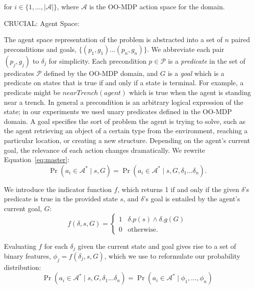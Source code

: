\documentclass[11pt]{article}
\begin{document}
\noindent for $i \in \{1, \ldots, |\mathcal{A}|\}$, where
$\mathcal{A}$ is the OO-MDP action space for the domain.

CRUCIAL: Agent Space:

The agent space representation of the problem is abstracted
into a set of $n$ paired preconditions and goals, $\{
(p_1, g_1) \ldots (p_{n}, g_{n}) \}$. We abbreviate each pair $(p_j,
g_j)$ to $\delta_j$ for simplicity. Each precondition $p \in
\mathcal{P}$ is a {\it predicate} in the set of predicates $\mathcal{P}$
defined by the OO-MDP domain, and $G$ is a {\it goal} which is a
predicate on states that is true if and only if a state is terminal. For example, a
predicate might be $nearTrench(agent)$ which is true when the agent is
standing near a trench.  In general a precondition is an arbitrary
logical expression of the state; in our experiments we used unary
predicates defined in the OO-MDP domain. A goal specifies the
sort of problem the agent is trying to solve, such as the agent
retrieving an object of a certain type from the environment, reaching
a particular location, or creating a new structure.  Depending on the
agent's current goal, the relevance of each action changes
dramatically.  We rewrite Equation~\ref{eq:master}:
\begin{equation}
\Pr(a_i \in \mathcal{A}^* \mid s, G) = \Pr(a_i \in \mathcal{A}^* \mid s, G, \delta_1 \ldots \delta_n).
\end{equation}

We introduce the indicator function $f$, which returns 1 if and only if the given $\delta$'s predicate is true in the provided state $s$, and $\delta$'s goal is entailed by the agent's current goal, $G$:
\begin{equation}
f(\delta, s, G) = 
\begin{cases}
1& \delta.p(s) \wedge \delta.g(G) \\
0& \text{otherwise.}
\end{cases}
\label{eq:f_func_def}
\end{equation}

Evaluating $f$ for each $\delta_j$ given the current state and goal gives rise to a set of binary features,
$\phi_j = f(\delta_j, s, G)$, which we use to reformulate our probability distribution:
\begin{equation}
\Pr(a_i \in \mathcal{A}^*  \mid s, G, \delta_1 \ldots \delta_n) = \Pr(a_i \in \mathcal{A}^*  \mid \phi_1, \ldots, \phi_n)
\label{eq:feature_rep}
\end{equation}
\end{document}
